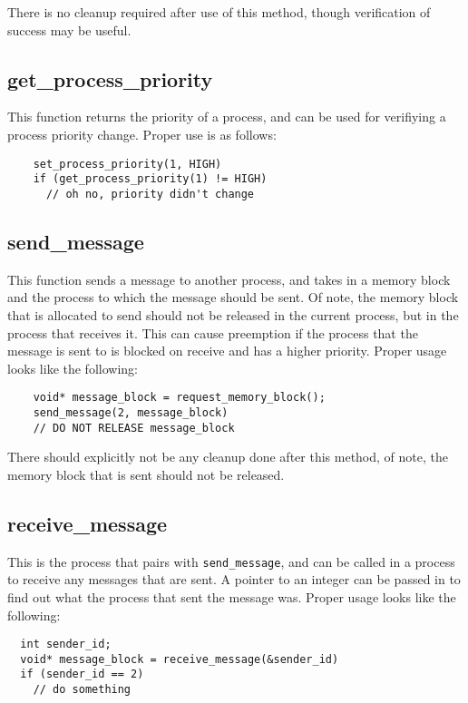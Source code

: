 \documentclass[12pt]{article}
\begin{document}
  There is no cleanup required after use of this method, though verification of success may be useful.

\subsection{get\_process\_priority}\label{getprocesspriorityf}
  This function returns the priority of a process, and can be used for verifiying a process priority change. Proper use is as follows:
  \begin{lstlisting}
    set_process_priority(1, HIGH)
    if (get_process_priority(1) != HIGH)
      // oh no, priority didn't change
  \end{lstlisting}

\subsection{send\_message}\label{sendmessagef}
  This function sends a message to another process, and takes in a memory block and the process to which the message should be sent. Of note, the memory block that is allocated to send should not be released in the current process, but in the process that receives it. This can cause preemption if the process that the message is sent to is blocked on receive and has a higher priority. Proper usage looks like the following:

  \begin{lstlisting}
    void* message_block = request_memory_block();
    send_message(2, message_block)
    // DO NOT RELEASE message_block
  \end{lstlisting}

  There should explicitly not be any cleanup done after this method, of note, the memory block that is sent should not be released.
\subsection{receive\_message}\label{receivemessagef}
  This is the process that pairs with \verb|send_message|, and can be called in a process to receive any messages that are sent. A pointer to an integer can be passed in to find out what the process that sent the message was. Proper usage looks like the following:
  \begin{lstlisting}
  int sender_id;
  void* message_block = receive_message(&sender_id)
  if (sender_id == 2)
    // do something
  \end{lstlisting}
\end{document}
